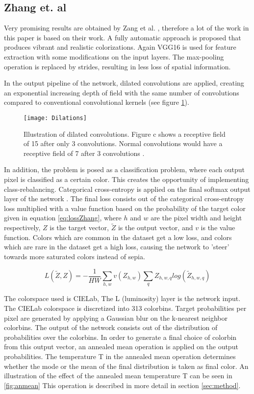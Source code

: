 \subsection{Zhang et. al}
Very promising results are obtained by Zang et al. \cite{Zhang}, therefore a lot of the work in this paper is based on their work.
A fully automatic approach is proposed that produces vibrant and realistic colorizations. Again VGG16 is used for feature extraction with some modifications on the input layers. The max-pooling operation is replaced by strides, resulting in less loss of spatial information. 

In the output pipeline of the network, dilated convolutions \cite{yu2015multi} are applied, creating an exponential increasing depth of field with the same number of convolutions compared to conventional convolutional kernels (see figure \ref{fig:dilations}).

\begin{figure}[h]
	\centering
	\texttt{[image: Dilations]}
	\caption{Illustration of dilated convolutions. Figure c shows a receptive field of 15 after only 3 convolutions. Normal convolutions would have a receptive field of 7 after 3 convolutions \cite{yu2015multi}.}
	\label{fig:dilations}
\end{figure}

In addition, the problem is posed as a classification problem, where each output pixel is classified as a certain color. This creates the opportunity of implementing class-rebalancing.
Categorical cross-entropy is applied on the final softmax output layer of the network \cite{de2005tutorial}. The final loss consists out of the categorical cross-entropy loss multiplied with a value function based on the probability of the target color given in equation \ref{eq:lossZhang}, where $h$ and $w$ are the pixel width and height respectively, $Z$ is the target vector, $\widetilde{Z}$ is the output vector, and $v$ is the value function.
Colors which are common in the dataset get a low loss, and colors which are rare in the dataset get a high loss, causing the network to 'steer' towards more saturated colors instead of sepia. 

\begin{equation}
L(\widetilde{Z},Z)=-\frac{1}{HW}\sum_{h,w}v(Z_{h,w})\sum_q^{}{Z_{h,w,q}log({\widetilde{Z}_{h,w,q}})}
\label{eq:lossZhang}
\end{equation}

The colorspace used is CIELab, The L (luminosity) layer is the network input. The CIELab colorspace is discretized into 313 colorbins. Target probabilities per pixel are generated by applying a Gaussian blur on the k-nearest neighbor colorbins. The output of the network consists out of the distribution of probabilities over the colorbins. In order to generate a final choice of colorbin from this output vector, an annealed mean operation is applied on the output probabilities. The temperature T in the annealed mean operation determines whether the mode or the mean of the final distribution is taken as final color. An illustration of the effect of the annealed mean temperature T can be seen in \ref{fig:anmean} This operation is described in more detail in section \ref{sec:method}.

